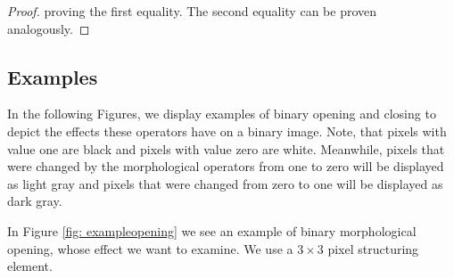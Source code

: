 \documentclass[a4paper,12pt]{article}
\theoremstyle{plain}
\theoremstyle{definition}
\begin{document}
\begin{proof}
	proving the first equality. The second equality can be proven analogously.
\end{proof}



\subsection{Examples}\label{section: morphologyexamples}

In the following Figures, we display examples of binary opening and closing to depict the effects these operators have on a binary image. Note, that pixels with value one are black and pixels with value zero are white. Meanwhile, pixels that were changed by the morphological operators from one to zero will be displayed as light gray and pixels that were changed from zero to one will be displayed as dark gray.

In Figure \ref{fig: exampleopening} we see an example of binary morphological opening, whose effect we want to examine. We use a $3 \times 3$ pixel structuring element.
\end{document}
